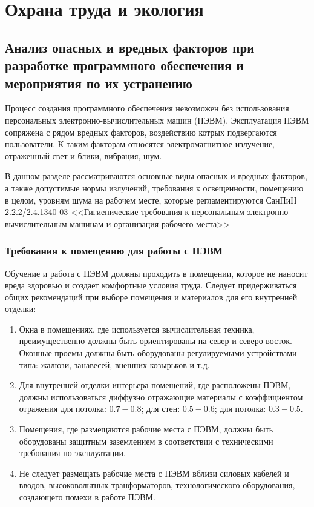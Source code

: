 \chapter{Охрана труда и экология}
\label{cha:ecolog}

\section{Анализ опасных и вредных факторов при разработке программного
	обеспечения и мероприятия по их устранению}
Процесс создания программного обеспечения невозможен без использования
персональных электронно-вычислительных машин (ПЭВМ). Эксплуатация ПЭВМ
сопряжена с рядом вредных факторов, воздействию котрых подвергаются
пользователи. К таким факторам относятся электромагнитное излучение,
отраженный свет и блики, вибрация, шум.

В данном разделе рассматриваются основные виды опасных и вредных факторов, а
также допустимые нормы излучений, требования к освещенности, помещению в
целом, уровням шума на рабочем месте, которые регламентируются СанПиН
2.2.2/2.4.1340-03 <<Гигиенические требования к персональным
электронно-вычислительным машинам и организация рабочего места>>

\subsection{Требования к помещению для работы с ПЭВМ}
Обучение и работа с ПЭВМ должны проходить в помещении, которое не наносит
вреда здоровью и создает комфортные условия труда. Следует придерживаться
общих рекомендаций при выборе помещения и материалов для его внутренней
отделки:
\begin{enumerate}
\item Окна в помещениях, где используется вычислительная техника,
	преимущественно должны быть ориентированы на север и северо-восток.
	Оконные проемы должны быть оборудованы регулируемыми устройствами
	типа: жалюзи, занавесей, внешних козырьков и т.д.

\item Для внутренней отделки интерьера помещений, где расположены ПЭВМ, должны
	использоваться диффузно отражающие материалы с коэффициентом отражения
	для потолка: $0.7 - 0.8$; для стен: $0.5 - 0.6$; для потолка: $0.3 -
	0.5$.
\item Помещения, где размещаются рабочие места с ПЭВМ, должны быть оборудованы
	защитным заземлением в соответствии с техническими требования по
	эксплуатации.
\item Не следует размещать рабочие места с ПЭВМ вблизи силовых кабелей и
	вводов, высоковольтных транформаторов, технологического оборудования,
	создающего помехи в работе ПЭВМ.
\end{enumerate}

